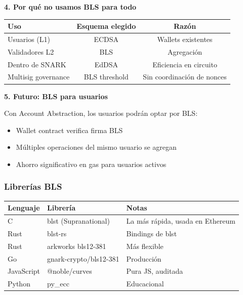 \documentclass[11pt,a4paper,twoside,openright]{book}
\theoremstyle{definition}
\theoremstyle{plain}
\theoremstyle{remark}
\begin{document}
\begin{bancozk}
\textbf{4. Por qué no usamos BLS para todo}

\begin{center}
\begin{tabular}{lcc}
\toprule
\textbf{Uso} & \textbf{Esquema elegido} & \textbf{Razón} \\
\midrule
Usuarios (L1) & ECDSA & Wallets existentes \\
Validadores L2 & BLS & Agregación \\
Dentro de SNARK & EdDSA & Eficiencia en circuito \\
Multisig governance & BLS threshold & Sin coordinación de nonces \\
\bottomrule
\end{tabular}
\end{center}

\textbf{5. Futuro: BLS para usuarios}

Con Account Abstraction, los usuarios podrán optar por BLS:
\begin{itemize}
    \item Wallet contract verifica firma BLS
    \item Múltiples operaciones del mismo usuario se agregan
    \item Ahorro significativo en gas para usuarios activos
\end{itemize}
\end{bancozk}

\subsubsection{Librerías BLS}

\begin{center}
\begin{tabular}{lll}
\toprule
\textbf{Lenguaje} & \textbf{Librería} & \textbf{Notas} \\
\midrule
C & blst (Supranational) & La más rápida, usada en Ethereum \\
Rust & blst-rs & Bindings de blst \\
Rust & arkworks bls12-381 & Más flexible \\
Go & gnark-crypto/bls12-381 & Producción \\
JavaScript & @noble/curves & Pura JS, auditada \\
Python & py\_ecc & Educacional \\
\bottomrule
\end{tabular}
\end{center}
\end{document}
